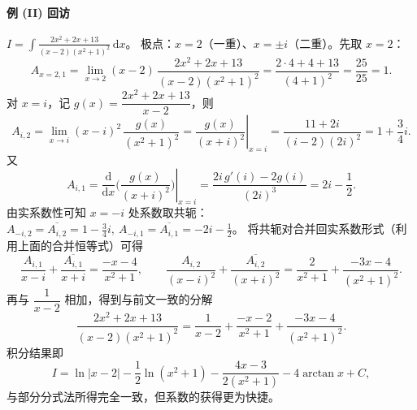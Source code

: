 \documentclass[lang=cn,newtx,10pt,scheme=chinese]{elegantbook}
\begin{document}
  \paragraph{例 (II) 回访} $\displaystyle I=\int \frac{2x^2+2x+13}{(x-2)(x^2+1)^2}\,\mathrm{d}x$。
  极点：$x=2$（一重）、$x=\pm i$（二重）。先取 $x=2$：
  \begin{equation*}
    A_{x=2,1}=\lim_{x\to 2}(x-2)\,\frac{2x^2+2x+13}{(x-2)(x^2+1)^2}
    =\frac{2\cdot 4+4+13}{(4+1)^2}=\frac{25}{25}=1.
  \end{equation*}
  对 $x=i$，记 $g(x)=\dfrac{2x^2+2x+13}{x-2}$，则
  \begin{equation*}
    A_{i,2}=\lim_{x\to i}(x-i)^2\,\frac{g(x)}{(x^2+1)^2}
    =\left.\frac{g(x)}{(x+i)^2}\right|_{x=i}
    =\frac{11+2i}{(i-2)(2i)^2}=1+\frac{3}{4}i.
  \end{equation*}
  又
  \begin{equation*}
    A_{i,1}=\left.\frac{\mathrm{d}}{\mathrm{d}x}\Big(\frac{g(x)}{(x+i)^2}\Big)\right|_{x=i}
    =\frac{2i\,g'(i)-2g(i)}{(2i)^3}=2i-\frac{1}{2}.
  \end{equation*}
  由实系数性可知 $x=-i$ 处系数取共轭：$A_{-i,2}=\overline{A_{i,2}}=1-\tfrac{3}{4}i,\ A_{-i,1}=\overline{A_{i,1}}=-2i-\tfrac{1}{2}$。
  将共轭对合并回实系数形式（利用上面的合并恒等式）可得
  \begin{equation*}
    \frac{A_{i,1}}{x-i}+\frac{\overline{A_{i,1}}}{x+i}=\frac{-x-4}{x^2+1},\qquad
    \frac{A_{i,2}}{(x-i)^2}+\frac{\overline{A_{i,2}}}{(x+i)^2}=\frac{2}{x^2+1}+\frac{-3x-4}{(x^2+1)^2}.
  \end{equation*}
  再与 $\dfrac{1}{x-2}$ 相加，得到与前文一致的分解
  \begin{equation*}
    \frac{2x^2+2x+13}{(x-2)(x^2+1)^2}
    =\frac{1}{x-2}+\frac{-x-2}{x^2+1}+\frac{-3x-4}{(x^2+1)^2}.
  \end{equation*}
  积分结果即
  \begin{equation*}
    I=\ln|x-2| -\frac{1}{2}\ln(x^2+1) - \frac{4x-3}{2(x^2+1)} - 4\arctan x + C,
  \end{equation*}
  与部分分式法所得完全一致，但系数的获得更为快捷。
\end{document}
